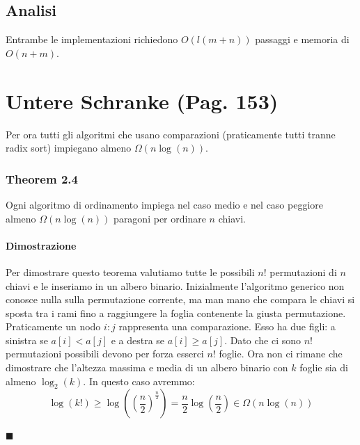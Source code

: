 \documentclass[a4paper]{book}
\newenvironment{mytheorem}[1]{\subsubsection*{Theorem #1}}{\begin{flushright}$\blacksquare$\end{flushright}}
\begin{document}
\subsection*{Analisi}
Entrambe le implementazioni richiedono $O(l(m+n))$ passaggi e memoria di $O(n+m)$.
\section{Untere Schranke (Pag. 153)}
Per ora tutti gli algoritmi che usano comparazioni (praticamente tutti tranne radix sort) impiegano almeno $\Omega (n \log (n))$. 
\begin{mytheorem}{2.4}
Ogni algoritmo di ordinamento impiega nel caso medio e nel caso peggiore almeno $\Omega (n \log (n))$ paragoni per ordinare $n$ chiavi.
\paragraph*{Dimostrazione}
Per dimostrare questo teorema valutiamo tutte le possibili $n!$ permutazioni di $n$ chiavi e le inseriamo in un albero binario. Inizialmente l'algoritmo generico non conosce nulla sulla permutazione corrente, ma man mano che compara le chiavi si sposta tra i rami fino a raggiungere la foglia contenente la giusta permutazione. Praticamente un nodo $i:j$ rappresenta una comparazione. Esso ha due figli: a sinistra se $a[i]<a[j]$ e a destra se $a[i] \geq a[j]$. Dato che ci sono $n!$ permutazioni possibili devono per forza esserci $n!$ foglie. Ora non ci rimane che dimostrare che l'altezza massima e media di un albero binario con $k$ foglie sia di almeno $\log_2 (k)$. In questo caso avremmo:
$$ \log (k!) \geq \log \left(\left(\frac{n}{2}\right)^{\frac{n}{2}}\right) = \frac{n}{2} \log \left(\frac{n}{2}\right) \in \Omega (n \log (n))$$
\end{mytheorem}
\end{document}
